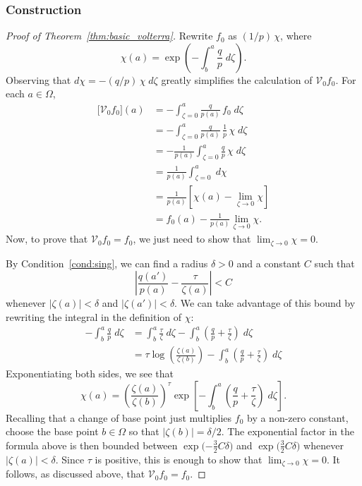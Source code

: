 \documentclass{article}
\theoremstyle{plain}
\newcommand{\hardpart}{\mathcal{V}_0}
\newcommand{\solproto}{f_0}
\newcommand{\domain}{\Omega}
\begin{document}
\subsubsection{Construction}\label{sec:construction}
\begin{proof}[Proof of Theorem~\ref{thm:basic_volterra}]
Rewrite $\solproto$ as $(1/p)\,\chi$, where
\[ \chi(a) = \exp\left(-\int_{b}^{a}\frac{q}{p}\;d\zeta\right). \]
Observing that $d\chi = -(q/p)\,\chi\;d\zeta$ greatly simplifies the calculation of $\hardpart \solproto$. For each $a \in \domain$,
\begin{align*}
\big[\hardpart \solproto\big](a) &= - \int_{\zeta=0}^{a} \frac{q}{p(a)}\,\solproto\;d\zeta \\
& = -\int_{\zeta=0}^{a} \frac{q}{p(a)}\,\frac{1}{p}\,\chi\;d\zeta \\
& = - \frac{1}{p(a)}  \int_{\zeta=0}^{a} \frac{q}{p}\,\chi\;d\zeta\\
& = \frac{1}{p(a)} \int_{\zeta=0}^{a}\;d\chi \\
& = \frac{1}{p(a)} \left[ \chi(a) - \lim_{\zeta \to 0} \chi \right] \\
& = \solproto(a) - \frac{1}{p(a)} \lim_{\zeta \to 0} \chi.
\end{align*}
Now, to prove that $\hardpart \solproto = \solproto$, we just need to show that $\lim_{\zeta \to 0} \chi = 0$.

By Condition~\eqref{cond:sing}, we can find a radius $\delta>0$ and a constant $C$ such that
\begin{equation}\label{eqn:sing-bound}
\left|\frac{q(a')}{p(a)} - \frac{\tau}{\zeta(a)}\right| < C
\end{equation}
whenever $|\zeta(a)| < \delta$ and $|\zeta(a')| < \delta$. We can take advantage of this bound by rewriting the integral in the definition of $\chi$:
\begin{align*}
-\int_b^a \frac{q}{p}\;d\zeta & = \int_b^a \frac{\tau}{\zeta}\;d\zeta - \int_b^a \left( \frac{q}{p} + \frac{\tau}{\zeta} \right)\;d\zeta \\
& = \tau \log\left(\frac{\zeta(a)}{\zeta(b)}\right) - \int_b^a \left( \frac{q}{p} + \frac{\tau}{\zeta} \right)\;d\zeta
\end{align*}
Exponentiating both sides, we see that
\[ \chi(a) = \left(\frac{\zeta(a)}{\zeta(b)}\right)^\tau \exp\left[-\int_b^a \left( \frac{q}{p} + \frac{\tau}{\zeta} \right)\;d\zeta\right]. \]
Recalling that a change of base point just multiplies $\solproto$ by a non-zero constant, choose the base point $b \in \Omega$ so that $|\zeta(b)| = \delta/2$. The exponential factor in the formula above is then bounded between $\exp\big({-\tfrac{3}{2}C\delta}\big)$ and $\exp\big(\tfrac{3}{2}C\delta\big)$ whenever $|\zeta(a)| < \delta$. Since $\tau$ is positive, this is enough to show that $\lim_{\zeta \to 0} \chi = 0$. It follows, as discussed above, that $\hardpart \solproto = \solproto$. 
\end{proof}
\end{document}
